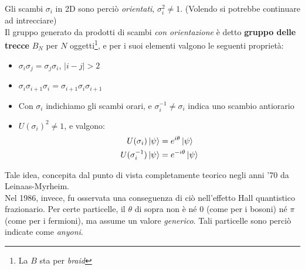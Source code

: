 \documentclass[../../FisicaTeorica.tex]{subfiles}
\begin{document}
Gli scambi $\sigma_i$ in 2D sono perciò \textit{orientati}, $\sigma_i^2 \neq 1$.
(Volendo si potrebbe continuare ad intrecciare)\\

Il gruppo generato da prodotti di scambi \textit{con orientazione} è detto \textbf{gruppo delle trecce} $B_N$ per $N$ oggetti\footnote{La $B$ sta per \textit{braid}}, e per i suoi elementi valgono le seguenti proprietà:
\begin{itemize}
\item $\sigma_i \sigma_j = \sigma_j \sigma_i$, $|i-j|>2$
\item $\sigma_i \sigma_{i+1}\sigma_i = \sigma_{i+1}\sigma_i\sigma_{i+1}$
\item Con $\sigma_i$ indichiamo gli scambi orari, e $\sigma_i^{-1}\neq \sigma_i$ indica uno scambio antiorario
\item $U(\sigma_i)^2 \neq 1$, e valgono:
\begin{align*}
U(\sigma_i) \ket{\psi} &= e^{i\theta} \ket{\psi}\\
U(\sigma_i^{-1}) \ket{\psi} &= e^{-i\theta}\ket{\psi}
\end{align*}
\end{itemize}
Tale idea, concepita dal punto di vista completamente teorico negli anni '70 da Leinaas-Myrheim.\\
Nel 1986, invece, fu osservata una conseguenza di ciò nell'effetto Hall quantistico frazionario. Per certe particelle, il $\theta$ di sopra non è né $0$ (come per i bosoni) né $\pi$ (come per i fermioni), ma assume un valore \textit{generico}. Tali particelle sono perciò indicate come \textit{anyoni}.\\
\end{document}
